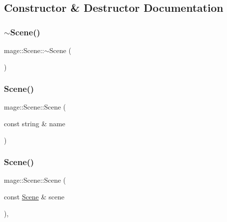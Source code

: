 \subsection{Constructor \& Destructor Documentation}
\hypertarget{classmage_1_1_scene_a6b97d0181285a69bd0a9789f534abc43}{}\label{classmage_1_1_scene_a6b97d0181285a69bd0a9789f534abc43} 
\subsubsection{\texorpdfstring{$\sim$\+Scene()}{~Scene()}}
{\footnotesize\ttfamily mage\+::\+Scene\+::$\sim$\+Scene (\begin{DoxyParamCaption}{ }\end{DoxyParamCaption})\hspace{0.3cm}{\ttfamily [default]}}

\hypertarget{classmage_1_1_scene_aab61b38547fc53aa9c5b3b559f4d2e26}{}\label{classmage_1_1_scene_aab61b38547fc53aa9c5b3b559f4d2e26} 
\subsubsection{\texorpdfstring{Scene()}{Scene()}\hspace{0.1cm}{\footnotesize\ttfamily [1/3]}}
{\footnotesize\ttfamily mage\+::\+Scene\+::\+Scene (\begin{DoxyParamCaption}\item[{const string \&}]{name }\end{DoxyParamCaption})\hspace{0.3cm}{\ttfamily [protected]}}

\hypertarget{classmage_1_1_scene_a88d83ccb2e10549d5370f850b2b4c228}{}\label{classmage_1_1_scene_a88d83ccb2e10549d5370f850b2b4c228} 
\subsubsection{\texorpdfstring{Scene()}{Scene()}\hspace{0.1cm}{\footnotesize\ttfamily [2/3]}}
{\footnotesize\ttfamily mage\+::\+Scene\+::\+Scene (\begin{DoxyParamCaption}\item[{const \hyperlink{classmage_1_1_scene}{Scene} \&}]{scene }\end{DoxyParamCaption})\hspace{0.3cm}{\ttfamily [private]}, {\ttfamily [delete]}}

